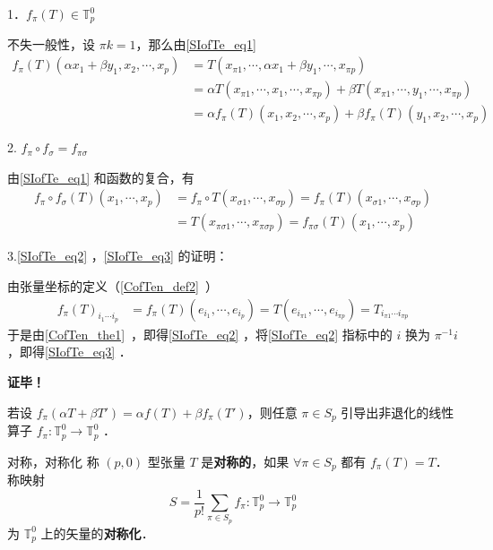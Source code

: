 1．$f_\pi(T)\in\mathbb{T}_p^0$

不失一般性，设 $\pi k=1$，那么由\autoref{SIofTe_eq1} 
\begin{equation}
\begin{aligned}
f_\pi(T)(\alpha x_1+\beta y_1,x_2,\cdots,x_p)&=T(x_{\pi1},\cdots,\alpha x_1+\beta y_1,\cdots,x_{\pi p})\\
&=\alpha T(x_{\pi1},\cdots,x_1,\cdots,x_{\pi p})+\beta T(x_{\pi1},\cdots,y_1,\cdots,x_{\pi p})\\
&=\alpha f_{\pi}(T)(x_1,x_2,\cdots,x_p)+\beta f_{\pi}(T)(y_1,x_2,\cdots,x_p)
\end{aligned}
\end{equation}

2. $f_\pi \circ f_\sigma=f_{\pi\sigma}$

由\autoref{SIofTe_eq1} 和函数的复合，有
\begin{equation}
\begin{aligned}
f_\pi\circ f_\sigma(T)(x_1,\cdots,x_p)&=f_\pi\circ T(x_{\sigma1},\cdots,x_{\sigma p})=f_\pi(T)(x_{\sigma1},\cdots,x_{\sigma p})\\
&=T(x_{\pi\sigma1},\cdots,x_{\pi\sigma p})=f_{\pi\sigma}(T)(x_1,\cdots,x_p)
\end{aligned}
\end{equation}


3.\autoref{SIofTe_eq2} ，\autoref{SIofTe_eq3} 的证明：

由张量坐标的定义（\autoref{CofTen_def2}~）
\begin{equation}
\begin{aligned}
f_{\pi}(T)_{i_1\cdots i_p}&=f_{\pi}(T)(e_{i_1},\cdots,e_{i_p})=T(e_{i_{\pi1}},\cdots,e_{i_{\pi p}})=T_{i_{\pi1}\cdots i_{\pi p}}
\end{aligned}
\end{equation}
于是由\autoref{CofTen_the1}~，即得\autoref{SIofTe_eq2} ，将\autoref{SIofTe_eq2} 指标中的 $i$ 换为  $\pi^{-1} i$，即得\autoref{SIofTe_eq3} ．

\textbf{证毕！}

若设 $f_\pi(\alpha T+\beta T')=\alpha f(T)+\beta f_\pi(T')$，则任意 $\pi \in S_p$ 引导出非退化的线性算子 $f_\pi:\mathbb{T}_p^0\rightarrow\mathbb{T}_p^0$ ．

\begin{definition}{对称，对称化}
称 $(p,0)$ 型张量 $T$ 是\textbf{对称的}，如果 $\forall \pi\in S_p$ 都有 $f_{\pi}(T)=T$．称映射 
\begin{equation}
S=\frac{1}{p!}\sum_{\pi\in S_p} f_\pi:\mathbb{T}_p^0\rightarrow\mathbb{T}_p^0
\end{equation}
为 $\mathbb{T}_p^0$ 上的矢量的\textbf{对称化}．
\end{definition}

